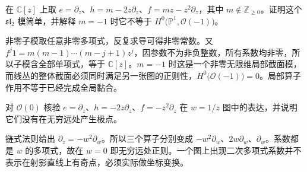 \begin{exercise}\label{b5:ex:C-negative-line-bundle-local-module}
	在 \(\mathbb C[z]\) 上取 \(e=\partial_z\)、\(h=m-2z\partial_z\)、\(f=mz-z^2\partial_z\)，其中 \(m\notin\mathbb Z_{\ge0}\)。证明这个 \(\mathfrak{sl}_2\) 模简单，并解释 \(m=-1\) 时它不等于 \(H^0\bigl(\mathbb P^1,\mathcal O(-1)\bigr)\)。
\end{exercise}
\begin{solution}
	非零子模取任意非零多项式，反复求导可得非零常数。又 \(f^j1=m(m-1)\cdots(m-j+1)z^j\)，因参数不为非负整数，所有系数均非零，所以子模含全部单项式，等于 \(\mathbb C[z]\)。\(m=-1\) 时这是一个非零无限维局部截面模，而线丛的整体截面必须同时满足另一张图的正则性，\(H^0\bigl(\mathcal O(-1)\bigr)=0\)。局部算子作用不等于已经完成全局黏合。
\end{solution}

\begin{exercise}\label{b5:ex:C-p1-vector-field-change}
	对 \(\mathcal O(0)\) 核验 \(e=\partial_z\)、\(h=-2z\partial_z\)、\(f=-z^2\partial_z\) 在 \(w=1/z\) 图中的表达，并说明它们没有在无穷远处产生极点。
\end{exercise}
\begin{solution}
	链式法则给出 \(\partial_z=-w^2\partial_w\)。所以三个算子分别变成 \(-w^2\partial_w\)、\(2w\partial_w\)、\(\partial_w\)。系数都是 \(w\) 的多项式，故在 \(w=0\) 即无穷远处正则。一个图上出现二次多项式系数并不表示在射影直线上有奇点，必须实际做坐标变换。
\end{solution}
